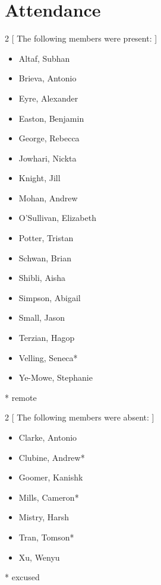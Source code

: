 \section*{Attendance}

\begin{multicols}{2}
    [
        The following members were present:
    ]
\begin{itemize}
    \item Altaf, Subhan
    \item Brieva, Antonio
    \item Eyre, Alexander
    \item Easton, Benjamin
    \item George, Rebecca
    \item Jowhari, Nickta 
    \item Knight, Jill
    \item Mohan, Andrew
    \item O'Sullivan, Elizabeth
    \item Potter, Tristan
    \item Schwan, Brian
    \item Shibli, Aisha
    \item Simpson, Abigail
    \item Small, Jason
    \item Terzian, Hagop
    \item Velling, Seneca*
    \item Ye-Mowe, Stephanie
\end{itemize}

\end{multicols}
* remote \\

\begin{multicols}{2}
    [
        The following members were absent:
    ]
\begin{itemize}
    \item Clarke, Antonio
    \item Clubine, Andrew*
    \item Goomer, Kanishk
    \item Mills, Cameron*
    \item Mistry, Harsh
    \item Tran, Tomson*
    \item Xu, Wenyu
\end{itemize}
\end{multicols}
* excused\\


